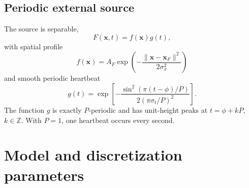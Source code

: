 \documentclass[11pt]{article}
\begin{document}
\subsection{Periodic external source}

The source is separable,
\begin{equation}
  F(\boldsymbol{x},t)=f(\boldsymbol{x})g(t),
\end{equation}
with spatial profile
\begin{equation}
  f(\boldsymbol{x})
  = A_F
    \exp\!\left(
      -\frac{\lVert\boldsymbol{x}-\boldsymbol{x}_F\rVert^2}
             {2\sigma_x^2}
    \right)
\end{equation}
and smooth periodic heartbeat
\begin{equation}
  g(t)
  = \exp\!\left[
      -\frac{
        \sin^2\!\left(\pi(t-\phi)/P\right)
      }{
        2\left(\pi\sigma_t/P\right)^2
      }
    \right].
  \label{eq:heartbeat}
\end{equation}
The function \(g\) is exactly \(P\)-periodic and has unit-height peaks at
\(t=\phi+kP\), \(k\in\mathbb{Z}\).  With \(P=1\), one heartbeat occurs every
second.

\section{Model and discretization parameters}
\end{document}

